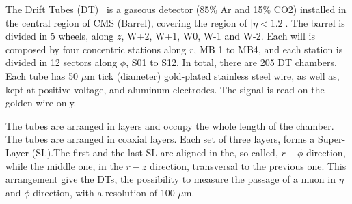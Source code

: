 The Drift Tubes (DT)~\cite{Teyssier:2015xjj} is a gaseous detector (85\% Ar and 15\% CO2) installed in the central region of CMS (Barrel), covering the region of $|\eta < 1.2|$. The barrel is divided in 5 wheels, along $z$, W+2, W+1, W0, W-1 and W-2. Each will is composed by four concentric stations along $r$, MB 1 to MB4, and each station is divided in 12 sectors along $\phi$, S01 to S12. In total, there are 205 DT chambers. Each tube has 50 $\mu$m tick (diameter) gold-plated stainless steel wire, as well as, kept at positive voltage, and aluminum electrodes. The signal is read on the golden wire only.

The tubes are arranged in layers and occupy the whole length of the chamber. The tubes are arranged in coaxial layers. Each set of three layers, forms a Super-Layer (SL).The first and the last SL are aligned in the, so called, $r-\phi$ direction, while the middle one, in the $r-z$ direction, transversal to the previous one. This arrangement give the DTs, the possibility to measure the passage of a muon in $\eta$ and $\phi$ direction, with a resolution of 100 $\mu$m.

